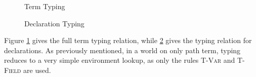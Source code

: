 
\begin{figure}[h]
\hfill {}
\caption{Term Typing}
\label{f:t_typ}
\end{figure}
\begin{figure}[h]
\hfill {}
\caption{Declaration Typing}
\label{f:d_typ}
\end{figure}
Figure \ref{f:t_typ} gives the full term typing relation, while \ref{f:d_typ} gives the typing relation for declarations. As previously mentioned, in a world on only path term, typing reduces to a very simple environment lookup, as only the rules \textsc{T-Var} and \textsc{T-Field} are used.

